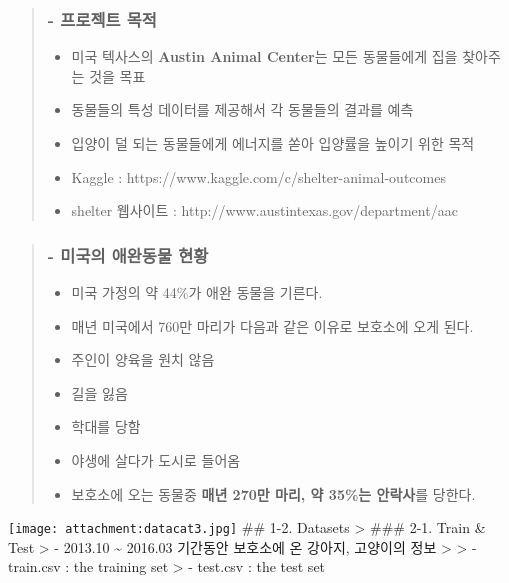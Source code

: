\documentclass[11pt]{article}
\makeatletter
\def\maxwidth{\ifdim\Gin@nat@width>\linewidth\linewidth
    \else\Gin@nat@width\fi}
\let\Oldincludegraphics\includegraphics
\renewcommand{\includegraphics}[1]{\Oldincludegraphics[width=.8\maxwidth]{#1}}
\providecommand{\tightlist}{%
      \setlength{\itemsep}{0pt}\setlength{\parskip}{0pt}}
\makeatother
\begin{document}
\begin{quote}
\subsubsection{- 프로젝트
목적}\label{uxd504uxb85cuxc81duxd2b8-uxbaa9uxc801}

\begin{itemize}
\tightlist
\item
  미국 텍사스의 \textbf{Austin Animal Center}는 모든 동물들에게 집을
  찾아주는 것을 목표
\item
  동물들의 특성 데이터를 제공해서 각 동물들의 결과를 예측
\item
  입양이 덜 되는 동물들에게 에너지를 쏟아 입양률을 높이기 위한 목적
\item
  Kaggle : https://www.kaggle.com/c/shelter-animal-outcomes
\item
  shelter 웹사이트 : http://www.austintexas.gov/department/aac
\end{itemize}
\end{quote}

\begin{quote}
\subsubsection{- 미국의 애완동물
현황}\label{uxbbf8uxad6duxc758-uxc560uxc644uxb3d9uxbb3c-uxd604uxd669}

\begin{itemize}
\item
  미국 가정의 약 44\%가 애완 동물을 기른다.
\item
  매년 미국에서 760만 마리가 다음과 같은 이유로 보호소에 오게 된다.\\
\item
  주인이 양육을 원치 않음
\item
  길을 잃음
\item
  학대를 당함
\item
  야생에 살다가 도시로 들어옴
\item
  보호소에 오는 동물중 \textbf{매년 270만 마리, 약 35\%는 안락사}를
  당한다.
\end{itemize}
\end{quote}

    \texttt{[image: attachment:datacat3.jpg]} \#\# 1-2. Datasets
\textgreater{} \#\#\# 2-1. Train \& Test \textgreater{} - 2013.10
\textasciitilde{} 2016.03 기간동안 보호소에 온 강아지, 고양이의 정보
\textgreater{} \textgreater{} - train.csv : the training set
\textgreater{} - test.csv : the test set
\end{document}
